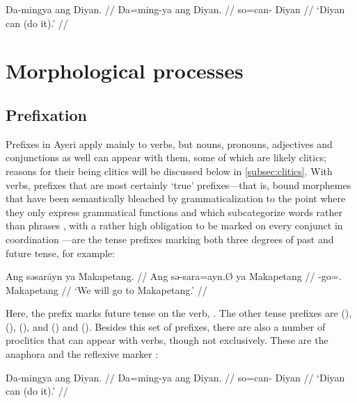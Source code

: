 \ex\begingl
	\gla Da-mingya ang Diyan. //
	\glb Da=ming-ya ang Diyan. //
	\glc so=can-\TsgM{} \Aarg{} Diyan //
	\glft `Diyan can (do it).' //
\endgl\xe

\section{Morphological processes}

\subsection{Prefixation}

Prefixes in Ayeri apply mainly to verbs, but nouns, pronouns, adjectives and
conjunctions as well can appear with them, some of which are likely clitics;
reasons for their being clitics will be discussed below in
\autoref{subsec:clitics}. With verbs, prefixes that are most certainly `true'
prefixes---that is, bound morphemes that have been semantically bleached by
grammaticalization to the point where they only express grammatical functions
\citep[157ff.]{lehmann2015} and which subcategorize words rather than phrases
\citep[117]{klavans1985}, with a rather high obligation to be marked on every
conjunct in coordination \citep[139]{spencerluis2012}---are the tense prefixes
marking both three degrees of past and future tense, for example:

\ex\begingl
	\gla Ang səsarāyn ya Makapetang. //
	\glb Ang sə-sara=ayn.Ø ya Makapetang //
	\glc \AgtT{} \Fut{}-go=\Fpl{}.\Top{} \Loc{} Makapetang //
	\glft `We will go to Makapetang.' //
\endgl\xe

Here, the prefix  marks future tense on the verb, 
. The other tense prefixes are  
(\NPst{}),  (\Pst{}),  (\RPst{}), and 
 (\NFut{}) and  (\RFut{}). Besides this set of 
prefixes, there are also a number of proclitics that can appear with verbs, 
though not exclusively. These are the anaphora  
and the reflexive marker 
:
 
\ex\begingl
	\gla Da-mingya ang Diyan. //
	\glb Da=ming-ya ang Diyan. //
	\glc so=can-\TsgM{} \Aarg{} Diyan //
	\glft `Diyan can (do it).' //
\endgl
% 
\xe

